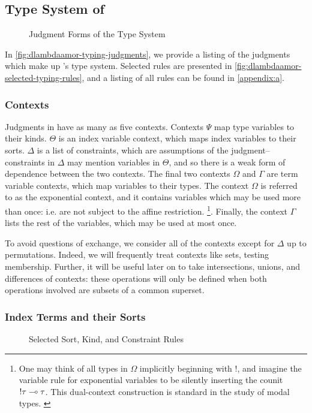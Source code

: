 \subsection{Type System of \dlambdaamor}
\begin{figure}

\caption{Judgment Forms of the \dlambdaamor Type System}
\label{fig:dlambdaamor-typing-judgments}
\end{figure}

In \autoref{fig:dlambdaamor-typing-judgments}, we provide a listing of the judgments which make up \dlambdaamor's type system. Selected rules are presented in \autoref{fig:dlambdaamor-selected-typing-rules}, and a listing of all rules can be found in \autoref{appendix:a}.

\subsubsection{Contexts}
Judgments in \dlambdaamor have as many as five contexts.
 Contexts $\Psi$ map type variables to their kinds. $\Theta$ is an index variable context, which maps index variables to their sorts. $\Delta$ is a list of constraints, which are assumptions of the judgment-- constraints in $\Delta$ may mention variables in $\Theta$, and so there is a weak form of dependence between the two contexts. The final two contexts $\Omega$ and $\Gamma$ are term variable contexts, which map variables to their types. The context $\Omega$ is referred to as the exponential context, and it contains variables which may be used more than once: i.e. are not subject to the affine restriction.
\footnote{
One may think of all types in $\Omega$ implicitly beginning with $!$, and imagine the variable rule for exponential variables to be silently inserting the counit $!\tau \multimap \tau$. This dual-context construction is standard in the study of modal types. \cite{kavvos:lmcs}
}. Finally, the context $\Gamma$ lists the rest of the variables, which may be used at most once.

To avoid questions of exchange, we consider all of the contexts except for $\Delta$ up to permutations. Indeed, we will frequently treat contexts like sets, testing membership. Further, it will be useful later on to take intersections, unions, and differences of contexts: these operations will only be defined when both operations involved are subsets of a common superset.

\subsubsection{Index Terms and their Sorts}
\begin{figure}

\caption{Selected Sort, Kind, and Constraint Rules}
\label{fig:dlambdaamor-selected-sort-kind-constr-rules}
\end{figure}

